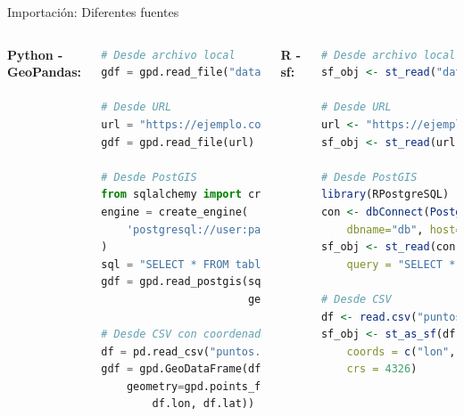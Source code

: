 \documentclass[10pt,aspectratio=169]{beamer}
\begin{document}
\begin{frame}[fragile]{Importación: Diferentes fuentes}
    \begin{columns}[T]
        \textbf{Python - GeoPandas:}
        \begin{lstlisting}[language=Python]
# Desde archivo local
gdf = gpd.read_file("data.shp")

# Desde URL
url = "https://ejemplo.com/data.geojson"
gdf = gpd.read_file(url)

# Desde PostGIS
from sqlalchemy import create_engine
engine = create_engine(
    'postgresql://user:pass@host/db'
)
sql = "SELECT * FROM tabla WHERE region='RM'"
gdf = gpd.read_postgis(sql, engine,
                       geom_col='geom')

# Desde CSV con coordenadas
df = pd.read_csv("puntos.csv")
gdf = gpd.GeoDataFrame(df,
    geometry=gpd.points_from_xy(
        df.lon, df.lat))
        \end{lstlisting}
        
        \textbf{R - sf:}
        \begin{lstlisting}[language=R]
# Desde archivo local
sf_obj <- st_read("data.shp")

# Desde URL
url <- "https://ejemplo.com/data.json"
sf_obj <- st_read(url)

# Desde PostGIS
library(RPostgreSQL)
con <- dbConnect(PostgreSQL(),
    dbname="db", host="host")
sf_obj <- st_read(con, 
    query = "SELECT * FROM tabla")

# Desde CSV
df <- read.csv("puntos.csv")
sf_obj <- st_as_sf(df,
    coords = c("lon", "lat"),
    crs = 4326)
        \end{lstlisting}
    \end{columns}
\end{frame}
\end{document}
